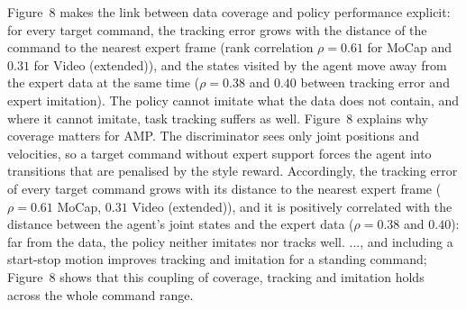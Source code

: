 Figure~8 makes the link between data coverage and policy performance explicit: for every target command, the tracking error grows with the distance of the command to the nearest expert frame (rank correlation $\rho = 0.61$ for MoCap and $0.31$ for Video (extended)), and the states visited by the agent move away from the expert data at the same time ($\rho = 0.38$ and $0.40$ between tracking error and expert imitation). The policy cannot imitate what the data does not contain, and where it cannot imitate, task tracking suffers as well.
Figure~8 explains why coverage matters for AMP. The discriminator sees only joint positions and velocities, so a target command without expert support forces the agent into transitions that are penalised by the style reward. Accordingly, the tracking error of every target command grows with its distance to the nearest expert frame ($\rho = 0.61$ MoCap, $0.31$ Video (extended)), and it is positively correlated with the distance between the agent's joint states and the expert data ($\rho = 0.38$ and $0.40$): far from the data, the policy neither imitates nor tracks well.
..., and including a start-stop motion improves tracking and imitation for a standing command; Figure~8 shows that this coupling of coverage, tracking and imitation holds across the whole command range.

